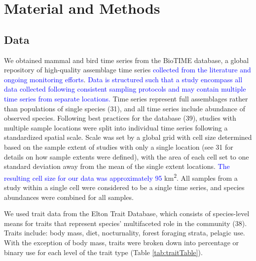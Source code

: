 \documentclass{article}
\begin{document}
\hypertarget{material-and-methods}{%
\section{Material and Methods}\label{material-and-methods}}

\hypertarget{data}{%
\subsection{Data}\label{data}}

We obtained mammal and bird time series from the BioTIME database, a
global repository of high-quality assemblage time series
\textcolor{blue}{collected from the literature and ongoing monitoring efforts}.
\textcolor{blue}{Data is structured such that a study encompass all data collected following consistent sampling protocols and may contain multiple time series from separate locations.}
Time series represent full assemblages rather than populations of single
species (31), and all time series include abundance of observed species.
Following best practices for the database (39), studies with multiple
sample locations were split into individual time series following a
standardized spatial scale. Scale was set by a global grid with cell
size determined based on the sample extent of studies with only a single
location (see 31 for details on how sample extents were defined), with
the area of each cell set to one standard deviation away from the mean
of the single extent locations.
\textcolor{blue}{The resulting cell size for our data was approximately 95 }km\textsuperscript{2}.
All samples from a study within a single cell were considered to be a
single time series, and species abundances were combined for all
samples.

We used trait data from the Elton Trait Database, which consists of
species-level means for traits that represent species' multifaceted role
in the community (38). Traits include: body mass, diet, nocturnality,
forest foraging strata, pelagic use. With the exception of body mass,
traits were broken down into percentage or binary use for each level of
the trait type (Table \ref{tab:traitTable}).
\end{document}
